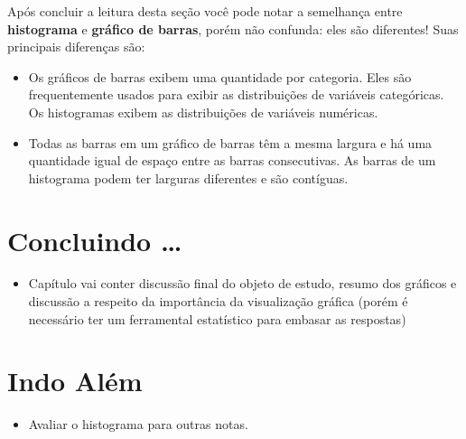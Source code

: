 \documentclass[
  oneside]{book}
\providecommand{\tightlist}{%
  \setlength{\itemsep}{0pt}\setlength{\parskip}{0pt}}
\begin{document}
Após concluir a leitura desta seção você pode notar a semelhança entre \textbf{histograma} e \textbf{gráfico de barras}, porém não confunda: eles são diferentes! Suas principais diferenças são:

\begin{itemize}
\item
  Os gráficos de barras exibem uma quantidade por categoria. Eles são frequentemente usados para exibir as distribuições de variáveis categóricas. Os histogramas exibem as distribuições de variáveis numéricas.
\item
  Todas as barras em um gráfico de barras têm a mesma largura e há uma quantidade igual de espaço entre as barras consecutivas. As barras de um histograma podem ter larguras diferentes e são contíguas.
\end{itemize}

\hypertarget{conc}{%
\section{Concluindo \ldots{}}\label{conc}}

\begin{itemize}
\tightlist
\item
  Capítulo vai conter discussão final do objeto de estudo, resumo dos gráficos e discussão a respeito da importância da visualização gráfica (porém é necessário ter um ferramental estatístico para embasar as respostas)
\end{itemize}

\hypertarget{indo-aluxe9m}{%
\section{Indo Além}\label{indo-aluxe9m}}

\begin{itemize}
\tightlist
\item
  Avaliar o histograma para outras notas.
\end{itemize}

  
\end{document}

